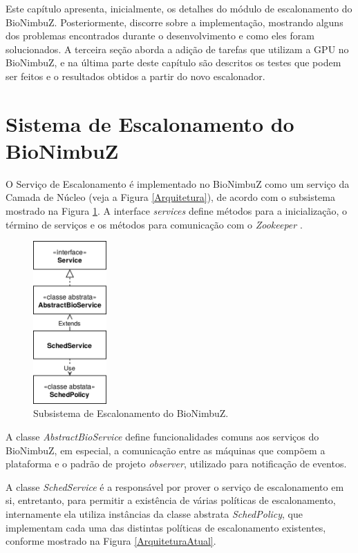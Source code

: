 
Este capítulo apresenta, inicialmente, os detalhes do módulo de escalonamento do BioNimbuZ. Posteriormente, discorre sobre a implementação, mostrando alguns dos problemas encontrados durante o desenvolvimento e como eles foram solucionados. A terceira seção aborda a adição de tarefas que utilizam a \acrshort{GPU} no BioNimbuZ, e na última parte deste capítulo são descritos os testes que podem ser feitos e o resultados obtidos a partir do novo escalonador.

\section{Sistema de Escalonamento do BioNimbuZ}

O Serviço de Escalonamento é implementado no BioNimbuZ como um serviço da Camada de Núcleo (veja a Figura \ref{Arquitetura}), de acordo com o subsistema mostrado na Figura \ref{SubsistemaDeEscalonamento}. A interface \textit{services} define métodos para a inicialização, o término de serviços e os métodos para comunicação com o \textit{Zookeeper} \cite{Zookeeper}. 
\begin{figure}[htbp]
	\centerline{\includegraphics[width=2.8cm]{img/SubsistemaDeEscalonamento.png}}
	\caption{Subsistema de Escalonamento do BioNimbuZ.}
	\label{SubsistemaDeEscalonamento}
\end{figure}
A classe \textit{AbstractBioService} define funcionalidades comuns aos serviços do BioNimbuZ, em especial, a comunicação entre as máquinas que compõem a plataforma e o padrão de projeto \textit{observer}, utilizado para notificação de eventos.

A classe \textit{SchedService} é a responsável por prover o serviço de escalonamento em si, entretanto, para permitir a existência de várias políticas de escalonamento, internamente ela utiliza instâncias da classe abstrata \textit{SchedPolicy}, que implementam cada uma das distintas políticas de escalonamento existentes, conforme mostrado na Figura \ref{ArquiteturaAtual}.

